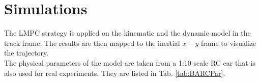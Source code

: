 
\section{Simulations}
The LMPC strategy is applied on the kinematic and the dynamic model in the track frame. The results are then mapped to the inertial $x-y$ frame to visualize the trajectory.\\
The physical parameters of the model are taken from a 1:10 scale RC car that is also used for real experiments. They are listed in Tab. \ref{tab:BARCPar}.

